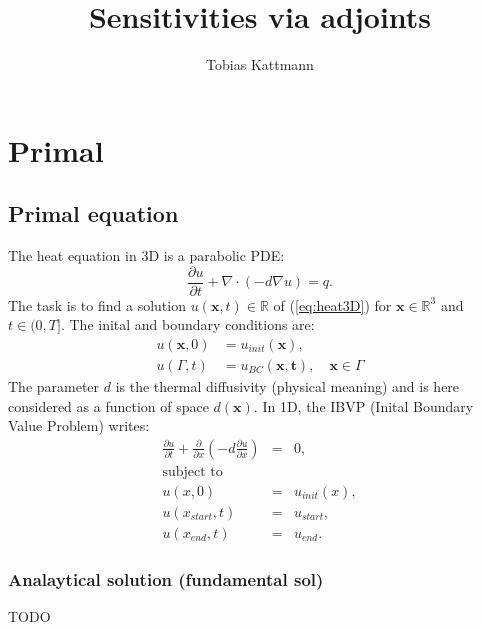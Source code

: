 \documentclass[10pt]{article}
\begin{document}
\title{Sensitivities via adjoints}
\author{Tobias Kattmann}
\maketitle
\tableofcontents

\section{Primal}
\subsection{Primal equation}
The heat equation in 3D is a parabolic PDE:
\begin{equation}\label{eq:heat3D}
\frac{\partial u}{\partial t} + \nabla\cdot \left(- d\nabla u \right) = q.
\end{equation}
The task is to find a solution $u\left(\mathbf{x}, t\right)\in\mathbb{R}$ of  (\ref{eq:heat3D}) for $\mathbf{x}\in\mathbb{R}^3$ and $t\in(0,T]$. The inital and boundary conditions are:
\begin{align}
u(\mathbf{x},0) & = u_{init}(\mathbf{x}), \\
u(\Gamma,t) & = u_{BC}(\mathbf{x,t}), \quad \mathbf{x}\in\Gamma
\end{align}
The parameter $d$ is the thermal diffusivity (physical meaning) and is here considered as a function of space $d\left(\mathbf{x}\right)$. In 1D, the IBVP (Inital Boundary Value Problem) writes:
\begin{eqnarray}
\frac{\partial u}{\partial t} +\frac{\partial}{\partial x} \left(- d \frac{\partial u}{\partial x}  \right) &=& 0, \\
\text{subject to} \\
u(x,0) &=& u_{init}(x), \\
u(x_{start},t)&=& u_{start}, \\
u(x_{end},t) &=& u_{end}.
\end{eqnarray}
\subsubsection{Analaytical solution (fundamental sol)}
TODO
\end{document}
